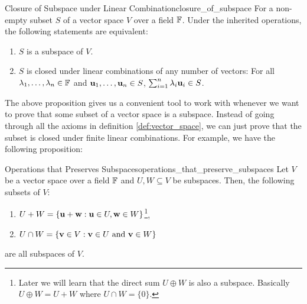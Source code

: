 \begin{proposition}{Closure of Subspace under Linear Combination}{closure_of_subspace}
	For a non-empty subset $S$ of a vector space $V$ over a field $\mathbb{F}$. Under the inherited operations, the following statements are equivalent:
	\begin{enumerate}
		\item $S$ is a subspace of $V$.
		\item $S$ is closed under linear combinations of any number of vectors: For all $\lambda_1, \dots, \lambda_n\in\mathbb{F}$ and ${\bf u}_1, \dots, {\bf u}_n\in S$, $\sum_{i=1}^n\lambda_i{\bf u}_i\in S$.	
	\end{enumerate} 
\end{proposition} 

\noindent The above proposition gives us a convenient tool to work with whenever we want to prove that some subset of a vector space is a subspace. Instead of going through all the axioms in definition \ref{def:vector_space}, we can just prove that the subset is closed under finite linear combinations. For example, we have the following proposition:


\begin{proposition}{Operations that Preserves Subspaces}{operations_that_preserve_subspaces}
	Let $V$ be a vector space over a field $\mathbb{F}$ and $U, W \subseteq V$ be subspaces. Then, the following subsets of $V$:
	\begin{enumerate}
		\item $U + W = \{{\bf u} + {\bf w}: {\bf u}\in U, {\bf w} \in W\}$\footnote{Later we will learn that the direct sum $U\oplus W$ is also a subspace. Basically $U\oplus W=U+W$ where $U\cap W=\{0\}$.},
		\item $U \cap W = \{{\bf v} \in V: {\bf v} \in U \text{ and } {\bf v}\in W\}$
	\end{enumerate} 

	\noindent are all subspaces of $V$.
\end{proposition} 

